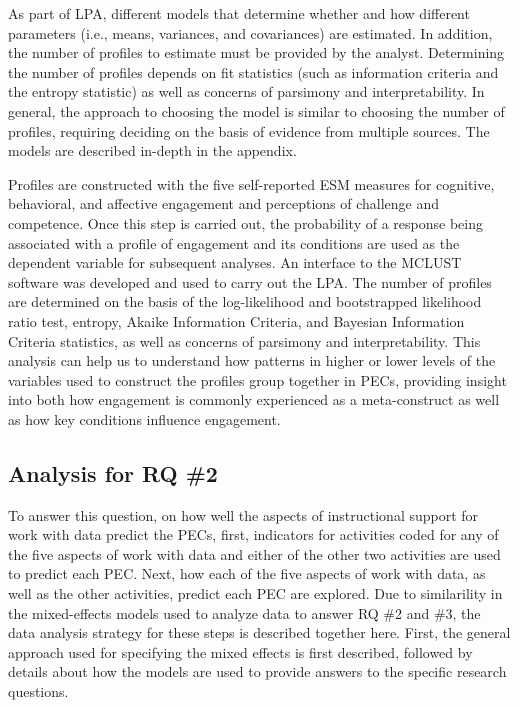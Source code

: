 \documentclass[]{msu-thesis}
\theoremstyle{definition}
\theoremstyle{definition}
\theoremstyle{definition}
\theoremstyle{remark}
\begin{document}
As part of LPA, different models that determine whether and how
different parameters (i.e., means, variances, and covariances) are
estimated. In addition, the number of profiles to estimate must be
provided by the analyst. Determining the number of profiles depends on
fit statistics (such as information criteria and the entropy statistic)
as well as concerns of parsimony and interpretability. In general, the
approach to choosing the model is similar to choosing the number of
profiles, requiring deciding on the basis of evidence from multiple
sources. The models are described in-depth in the appendix.

Profiles are constructed with the five self-reported ESM measures for
cognitive, behavioral, and affective engagement and perceptions of
challenge and competence. Once this step is carried out, the probability
of a response being associated with a profile of engagement and its
conditions are used as the dependent variable for subsequent analyses.
An interface to the MCLUST software was developed and used to carry out
the LPA. The number of profiles are determined on the basis of the
log-likelihood and bootstrapped likelihood ratio test, entropy, Akaike
Information Criteria, and Bayesian Information Criteria statistics, as
well as concerns of parsimony and interpretability. This analysis can
help us to understand how patterns in higher or lower levels of the
variables used to construct the profiles group together in PECs,
providing insight into both how engagement is commonly experienced as a
meta-construct as well as how key conditions influence engagement.

\subsection{Analysis for RQ \#2}\label{analysis-for-rq-2}

To answer this question, on how well the aspects of instructional
support for work with data predict the PECs, first, indicators for
activities coded for any of the five aspects of work with data and
either of the other two activities are used to predict each PEC. Next,
how each of the five aspects of work with data, as well as the other
activities, predict each PEC are explored. Due to similarility in the
mixed-effects models used to analyze data to answer RQ \#2 and \#3, the
data analysis strategy for these steps is described together here.
First, the general approach used for specifying the mixed effects is
first described, followed by details about how the models are used to
provide answers to the specific research questions.
\end{document}
